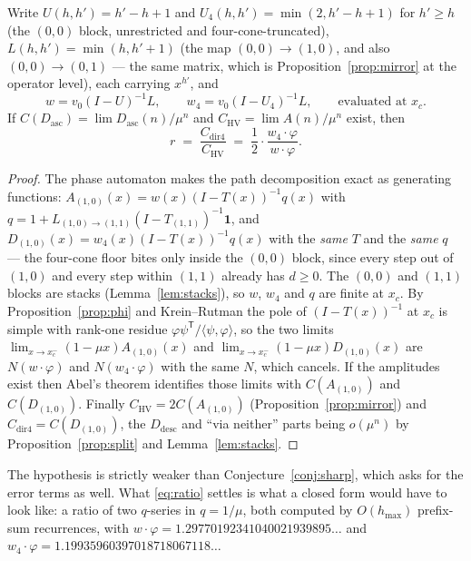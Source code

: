 \documentclass[11pt]{article}
\newcommand{\HV}{\mathrm{HV}}
\begin{document}
\begin{proposition}
\label{prop:ratio}
Write $U(h,h') = h'-h+1$ and $U_4(h,h') = \min(2, h'-h+1)$ for $h' \ge h$ (the
$(0,0)$ block, unrestricted and four-cone-truncated), $L(h,h') = \min(h,h'{+}1)$
(the map $(0,0)\to(1,0)$, and also $(0,0)\to(0,1)$ --- the same matrix, which is
Proposition~\ref{prop:mirror} at the operator level), each carrying $x^{h'}$,
and
\[
  w = v_0(I-U)^{-1}L, \qquad w_4 = v_0(I-U_4)^{-1}L,
  \qquad\text{evaluated at } x_c .
\]
If $C(D_{\mathrm{asc}}) = \lim D_{\mathrm{asc}}(n)/\mu^n$ and
$C_{\HV} = \lim A(n)/\mu^n$ exist, then
\begin{equation}
  r \;=\; \frac{C_{\text{dir4}}}{C_{\HV}}
    \;=\; \frac12\cdot\frac{w_4\cdot\varphi}{w\cdot\varphi} .
  \label{eq:ratio}
\end{equation}
\end{proposition}

\begin{proof}
The phase automaton makes the path decomposition exact as generating functions:
$A_{(1,0)}(x) = w(x)(I-T(x))^{-1}q(x)$ with
$q = 1 + L_{(1,0)\to(1,1)}(I-T_{(1,1)})^{-1}\mathbf 1$, and
$D_{(1,0)}(x) = w_4(x)(I-T(x))^{-1}q(x)$ with the \emph{same} $T$ and the
\emph{same} $q$ --- the four-cone floor bites only inside the $(0,0)$ block,
since every step out of $(1,0)$ and every step within $(1,1)$ already has
$d \ge 0$. The $(0,0)$ and $(1,1)$ blocks are stacks
(Lemma~\ref{lem:stacks}), so $w$, $w_4$ and $q$ are finite at $x_c$. By
Proposition~\ref{prop:phi} and Krein--Rutman the pole of $(I-T(x))^{-1}$ at
$x_c$ is simple with rank-one residue $\varphi\psi^{\mathsf T}/\langle\psi,
\varphi\rangle$, so the two limits
$\lim_{x\to x_c^-}(1-\mu x)A_{(1,0)}(x)$ and
$\lim_{x\to x_c^-}(1-\mu x)D_{(1,0)}(x)$ are $N(w\cdot\varphi)$ and
$N(w_4\cdot\varphi)$ with the same $N$, which cancels. If the amplitudes exist
then Abel's theorem identifies those limits with $C(A_{(1,0)})$ and
$C(D_{(1,0)})$. Finally $C_{\HV} = 2C(A_{(1,0)})$
(Proposition~\ref{prop:mirror}) and $C_{\text{dir4}} = C(D_{(1,0)})$, the
$D_{\mathrm{desc}}$ and ``via neither'' parts being $o(\mu^n)$ by
Proposition~\ref{prop:split} and Lemma~\ref{lem:stacks}.
\end{proof}

The hypothesis is strictly weaker than Conjecture~\ref{conj:sharp}, which asks
for the error terms as well. What \eqref{eq:ratio} settles is what a closed form
would have to look like: a ratio of two $q$-series in $q = 1/\mu$, both computed
by $O(h_{\max})$ prefix-sum recurrences, with
$w\cdot\varphi = 1.29770192341040021939895\dots$ and
$w_4\cdot\varphi = 1.19935960397018718067118\dots$
\end{document}

